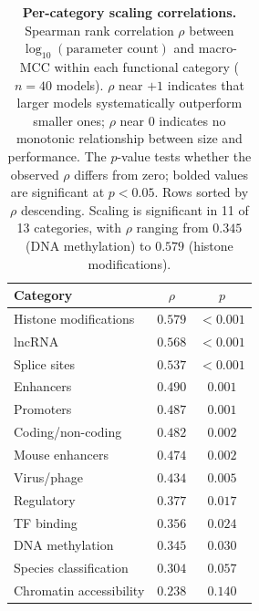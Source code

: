 \documentclass{llmxive}
\begin{document}
\begin{table}[!htbp]
\centering
\small
\begin{tabular}{lcc}
\toprule
\textbf{Category} & \textbf{$\rho$} & \textbf{$p$} \\
\midrule
Histone modifications      & $\mathbf{0.579}$ & $<0.001$ \\
lncRNA                     & $\mathbf{0.568}$ & $<0.001$ \\
Splice sites               & $\mathbf{0.537}$ & $<0.001$ \\
Enhancers                  & $\mathbf{0.490}$ & $0.001$ \\
Promoters                  & $\mathbf{0.487}$ & $0.001$ \\
Coding/non-coding          & $\mathbf{0.482}$ & $0.002$ \\
Mouse enhancers            & $\mathbf{0.474}$ & $0.002$ \\
Virus/phage                & $\mathbf{0.434}$ & $0.005$ \\
Regulatory                 & $\mathbf{0.377}$ & $0.017$ \\
TF binding                 & $\mathbf{0.356}$ & $0.024$ \\
DNA methylation            & $\mathbf{0.345}$ & $0.030$ \\
Species classification     & $0.304$          & $0.057$ \\
Chromatin accessibility    & $0.238$          & $0.140$ \\
\bottomrule
\end{tabular}
\caption{\textbf{Per-category scaling correlations.} Spearman rank
correlation $\rho$ between $\log_{10}(\text{parameter count})$ and
macro-MCC within each functional category ($n=40$ models). $\rho$
near $+1$ indicates that larger models systematically outperform
smaller ones; $\rho$ near $0$ indicates no monotonic relationship
between size and performance. The $p$-value tests whether the
observed $\rho$ differs from zero; bolded values are significant at
$p<0.05$. Rows sorted by $\rho$ descending. Scaling is significant
in 11 of 13 categories, with $\rho$ ranging from $0.345$ (DNA
methylation) to $0.579$ (histone modifications).}
\label{tab:per_cat_scaling}
\end{table}
\end{document}

